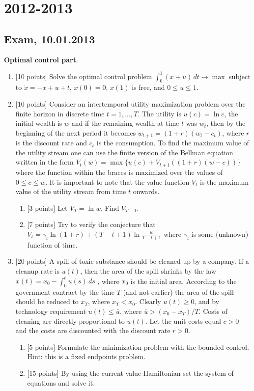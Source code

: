 \documentclass[pdftex,12pt,a4paper]{article}
\begin{document}
\section{2012-2013}

\subsection{Exam, 10.01.2013}

\textbf{Optimal control part}.  

\vspace{20pt}

\begin{enumerate}
\item $[$10 points] Solve the optimal control problem 
$\int_0^1 (x+u)\, dt \to \max$
subject to $\dot{x}=-x+u+t$, $x(0)=0$, $x(1)$ is free, and $0\leq u\leq 1$.

\item $[$10 points] Consider an intertemporal utility maximization problem over the finite horizon in discrete time $t=1,\ldots,T$. The utility is $u(c)=\ln c$, the initial wealth is $w$ and if the remaining wealth at time $t$ was $w_t$, then by the beginning of the next period it becomes $w_{t+1}=(1+r)(w_t-c_t)$, where $r$ is the discount rate and $c_t$ is the consumption.  To find the maximum value of the utility stream one can use the finite version of the Bellman equation written in the form
$V_t(w)=\max \{ u(c) + V_{t+1}((1+r)(w-c)) \}$
where the function within the braces is maximized over the values of $0 \leq c \leq w$. It is important to note that the value function $V_t$ is the maximum value of the utility stream from time $t$ onwards.
\begin{enumerate}
\item $[$3 points] Let $V_T=\ln w$. Find $V_{T-1}$.
\item $[$7 points] Try to verify the conjecture that 
$V_t=\gamma_t \ln (1+r) + (T-t+1) \ln \frac{w}{T-t+1} $
where $\gamma_t$ is some (unknown) function of time.
\end{enumerate}

\item $[$20 points] A spill of toxic substance should be cleaned up by a company.  If a cleanup rate is $u(t)$, then the area of the spill shrinks by the law 
$x(t)=x_0-\int_0^t u(s)\, ds$
, where $x_0$ is the initial area. According to the government contract by the time $T$ (and not earlier) the area of the spill should  be reduced to $x_T$, where $x_T<x_0$.  Clearly $u(t)\geq 0$, and by technology requirement $u(t)\leq \bar{u}$, where $\bar{u}>(x_0-x_T)/T$. Costs of cleaning are directly proportional to $u(t)$. Let the unit costs equal $c>0$ and the costs are discounted with the discount rate $r>0$.
\begin{enumerate}
\item $[$5 points] Formulate the minimization problem with the bounded control. Hint: this is a fixed endpoints problem.
\item $[$15 points] By using the current value Hamiltonian set the system of equations and solve it.  
\end{enumerate}
\end{enumerate}
\end{document}
